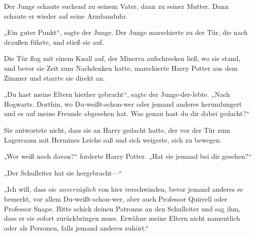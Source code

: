 Der Junge schaute suchend zu seinem Vater, dann zu seiner Mutter. Dann schaute er wieder auf seine Armbanduhr.


„Ein guter Punkt“, sagte der Junge. Der Junge marschierte zu der Tür, die nach draußen führte, und stieß sie auf.

\later

Die Tür flog mit einem Knall auf, der Minerva aufschrecken ließ, wo sie stand, und bevor sie Zeit zum Nachdenken hatte, marschierte Harry Potter aus dem Zimmer und starrte sie direkt an.

„Du hast meine Eltern hierher gebracht“, sagte der Junge-der-lebte.
„Nach Hogwarts. Dorthin, wo Du-weißt-schon-wer oder jemand anderes herumlungert und es auf meine Freunde abgesehen hat. Was genau hast du dir dabei gedacht?“

Sie antwortete nicht, dass sie an Harry gedacht hatte, der vor der Tür zum Lagerraum mit Hermines Leiche saß und sich weigerte, sich zu bewegen.

„Wer weiß noch davon?“ forderte Harry Potter. „Hat sie jemand bei dir gesehen?“

„Der Schulleiter hat sie hergebracht—“

„Ich will, dass sie \emph{unverzüglich} von hier verschwinden, bevor jemand anderes es bemerkt, vor allem Du-weißt-schon-wer, aber auch Professor Quirrell oder Professor Snape. Bitte schick deinen Patronus an den Schulleiter und sag ihm, dass er sie sofort zurückbringen muss. Erwähne meine Eltern nicht namentlich oder als Personen, falls jemand anderes zuhört.“

